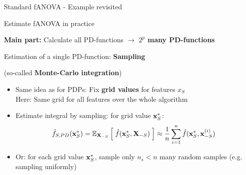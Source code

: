\documentclass[10pt,compress,t,notes=noshow, xcolor=table]{beamer}
\newcommand{\Xv}{\mathbf{X}} %
\begin{document}
\begin{frame}{Standard fANOVA - Example revisited}
\begin{example}
\begin{itemize}
{        }
        
    \end{itemize}
\end{example}
    
\end{frame}

\begin{frame}{Estimate fANOVA in practice
}

\textbf{Main part:} Calculate all PD-functions $\rightarrow$ \textbf{$2^p$ many PD-functions}

Estimation of a single PD-function: \textbf{Sampling}

(so-called \textbf{Monte-Carlo integration})
\begin{itemize}
    \item Same idea as for PDPs: Fix \textbf{grid values} for features $x_S$ \\
    Here: Same grid for all features over the whole algorithm
    \item Estimate integral by sampling: for grid value $\mathbf{x}_S^*$:
    $$
    \fh_{S, PD}(\xv_S^*) 
    = \mathbb{E}_{\Xv_{-S}} \left[ \; \fh(\xv_S^*, \Xv_{-S}) \; \right]
    \approx \frac{1}{n} \sum_{i=1}^n \fh(\xv_S^*, \xv_{-S}^{(i)})
    $$
    \item Or: for each grid value $\mathbf{x}_S^*$, sample only $n_s < n$ many random samples (e.g. sampling uniformly)
\end{itemize}


    
\end{frame}
\end{document}
